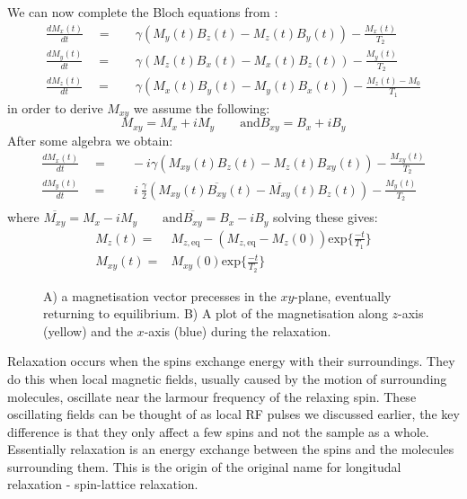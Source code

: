 We can now complete the Bloch equations from :
\begin{align}
  \frac{dM_x(t)}{dt}\quad=&\quad\gamma(M_y(t)B_z(t)-M_z(t)B_y(t)) - \frac{M_x(t)}{T_2}\\
  \frac{dM_y(t)}{dt}\quad=&\quad\gamma(M_z(t)B_x(t)-M_x(t)B_z(t)) - \frac{M_y(t)}{T_2}\\
  \frac{dM_z(t)}{dt}\quad=&\quad\gamma(M_x(t)B_y(t)-M_y(t)B_x(t)) - \frac{M_z(t)-M_0}{T_1}
\end{align}
in order to derive $M_{xy}$ we assume the following:
\begin{equation}
  M_{xy} = M_x + iM_y\qquad\text{and} B_{xy} = B_x + iB_y
\end{equation}
After some algebra we obtain:
\begin{align}
  \frac{dM_x(t)}{dt}\quad=&\quad-i\gamma(M_{xy}(t)B_z(t)-M_z(t)B_{xy}(t)) - \frac{M_{xy}(t)}{T_2}\\
  \frac{dM_y(t)}{dt}\quad=&\quad~i~\frac{\gamma}{2}(M_{xy}(t)\overline{B_{xy}}(t)-\overline{M_{xy}}(t)B_z(t)) - \frac{M_y(t)}{T_2}\\
\end{align}
where $\overline{M_{xy}} = M_x - iM_y\qquad\text{and} \overline{B_{xy}} = B_x - iB_y$
solving these gives:
\begin{align}
  M_z(t) =& M_{z,\text{eq}} - (M_{z,\text{eq}}-M_z(0))\text{exp}\{\frac{-t}{T_1}\}\\
  M_{xy}(t) =& M_{xy}(0)\text{exp}\{\frac{-t}{T_2}\}
\end{align}

\begin{figure}[h]
  \caption{A) a magnetisation vector precesses in the $xy$-plane, eventually returning to equilibrium.
  B) A plot of the magnetisation along $z$-axis (yellow) and the $x$-axis (blue) during the relaxation.}
  \label{fig:t1t2}
\end{figure}

Relaxation occurs when the spins exchange energy with their surroundings. They do
this when local magnetic fields, usually caused by the motion of surrounding molecules, oscillate
near the larmour frequency of the relaxing spin. These oscillating fields can be thought of
as local RF pulses we discussed earlier, the key difference is that they only affect a few spins
and not the sample as a whole. Essentially relaxation is an energy exchange between the
spins and the molecules surrounding them. This is the origin of the original name for longitudal
relaxation - spin-lattice relaxation.

\newpage
